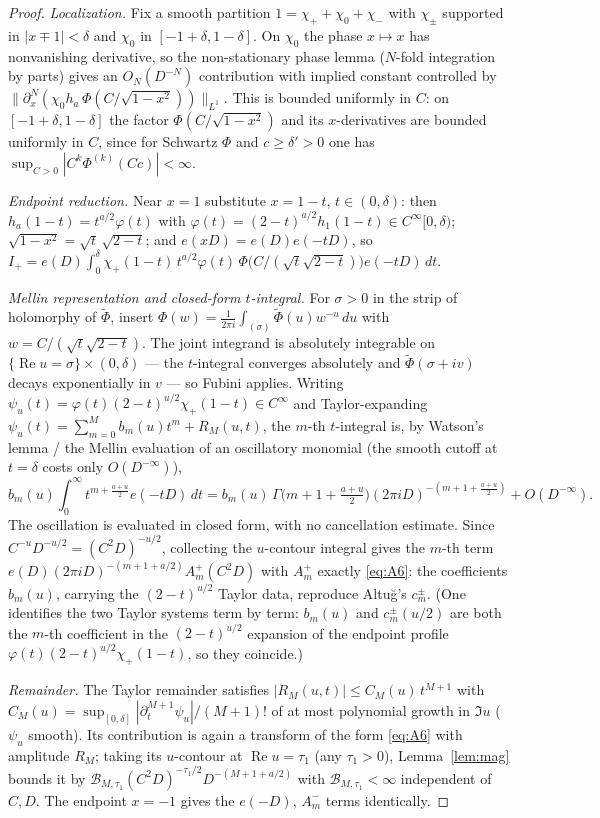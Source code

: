 \documentclass[11pt]{article}
\theoremstyle{definition}
\newcommand{\wt}[1]{\widetilde{#1}}
\renewcommand{\Re}{\operatorname{Re}}
\begin{document}
\begin{proof}
\emph{Localization.} Fix a smooth partition $1=\chi_++\chi_0+\chi_-$ with $\chi_\pm$ supported in
$|x\mp1|<\delta$ and $\chi_0$ in $[-1+\delta,1-\delta]$. On $\chi_0$ the phase $x\mapsto x$ has
nonvanishing derivative, so the non-stationary phase lemma \cite[Thm.~7.7.1]{Hormander} ($N$-fold
integration by parts) gives an $O_N(D^{-N})$ contribution with implied constant controlled by
$\|\partial_x^N(\chi_0 h_a\,\Phi(C/\sqrt{1-x^2}))\|_{L^1}$. This is bounded uniformly in $C$: on
$[-1+\delta,1-\delta]$ the factor $\Phi(C/\sqrt{1-x^2})$ and its $x$-derivatives are bounded uniformly
in $C$, since for Schwartz $\Phi$ and $c\ge\delta'>0$ one has $\sup_{C>0}|C^k\Phi^{(k)}(Cc)|<\infty$.

\emph{Endpoint reduction.} Near $x=1$ substitute $x=1-t$, $t\in(0,\delta)$: then
$h_a(1-t)=t^{a/2}\varphi(t)$ with $\varphi(t)=(2-t)^{a/2}h_1(1-t)\in C^\infty[0,\delta)$;
$\sqrt{1-x^2}=\sqrt t\,\sqrt{2-t}$; and $e(xD)=e(D)e(-tD)$, so
$I_+=e(D)\int_0^\delta \chi_+(1-t)\,t^{a/2}\varphi(t)\,\Phi\big(C/(\sqrt t\sqrt{2-t})\big)e(-tD)\,dt$.

\emph{Mellin representation and closed-form $t$-integral.} For $\sigma>0$ in the strip of holomorphy
of $\wt\Phi$, insert $\Phi(w)=\frac1{2\pi i}\int_{(\sigma)}\wt\Phi(u)w^{-u}\,du$ with
$w=C/(\sqrt t\sqrt{2-t})$. The joint integrand is absolutely integrable on
$\{\Re u=\sigma\}\times(0,\delta)$ --- the $t$-integral converges absolutely and $\wt\Phi(\sigma+iv)$
decays exponentially in $v$ --- so Fubini applies. Writing
$\psi_u(t)=\varphi(t)(2-t)^{u/2}\chi_+(1-t)\in C^\infty$ and Taylor-expanding
$\psi_u(t)=\sum_{m=0}^{M}b_m(u)t^m+R_M(u,t)$, the $m$-th $t$-integral is, by Watson's lemma / the
Mellin evaluation of an oscillatory monomial \cite[Ch.~3]{Wong} (the smooth cutoff at $t=\delta$ costs
only $O(D^{-\infty})$),
\[
  b_m(u)\!\int_0^\infty t^{m+\frac{a+u}{2}}e(-tD)\,dt
  = b_m(u)\,\Gamma\!\big(m{+}1{+}\tfrac{a+u}{2}\big)(2\pi iD)^{-(m+1+\frac{a+u}{2})}+O(D^{-\infty}).
\]
The oscillation is evaluated in closed form, with no cancellation estimate. Since
$C^{-u}D^{-u/2}=(C^2D)^{-u/2}$, collecting the $u$-contour integral gives the $m$-th term
$e(D)(2\pi iD)^{-(m+1+a/2)}A^+_m(C^2D)$ with $A^+_m$ exactly \eqref{eq:A6}: the coefficients $b_m(u)$,
carrying the $(2-t)^{u/2}$ Taylor data, reproduce Altu\u{g}'s $c^\pm_m$. (One identifies the two Taylor
systems term by term: $b_m(u)$ and $c^\pm_m(u/2)$ are both the $m$-th coefficient in the $(2-t)^{u/2}$
expansion of the endpoint profile $\varphi(t)(2-t)^{u/2}\chi_+(1-t)$, so they coincide.)

\emph{Remainder.} The Taylor remainder satisfies $|R_M(u,t)|\le C_M(u)\,t^{M+1}$ with
$C_M(u)=\sup_{[0,\delta]}|\partial_t^{M+1}\psi_u|/(M+1)!$ of at most polynomial growth in $\Im u$
($\psi_u$ smooth). Its contribution is again a transform of the form \eqref{eq:A6} with amplitude
$R_M$; taking its $u$-contour at $\Re u=\tau_1$ (any $\tau_1>0$), Lemma~\ref{lem:mag} bounds it by
$\mathcal B_{M,\tau_1}(C^2D)^{-\tau_1/2}D^{-(M+1+a/2)}$ with $\mathcal B_{M,\tau_1}<\infty$
independent of $C,D$. The endpoint $x=-1$ gives the $e(-D)$, $A^-_m$ terms identically.
\end{proof}
\end{document}
